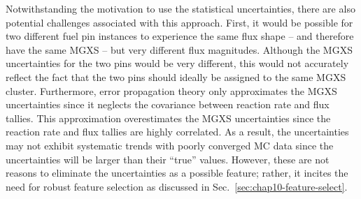 Notwithstanding the motivation to use the statistical uncertainties, there are also potential challenges associated with this approach. First, it would be possible for two different fuel pin instances to experience the same flux shape -- and therefore have the same \ac{MGXS} -- but very different flux magnitudes. Although the \ac{MGXS} uncertainties for the two pins would be very different, this would not accurately reflect the fact that the two pins should ideally be assigned to the same \ac{MGXS} cluster. Furthermore, error propagation theory only approximates the \ac{MGXS} uncertainties since it neglects the covariance between reaction rate and flux tallies. This approximation overestimates the \ac{MGXS} uncertainties since the reaction rate and flux tallies are highly correlated. As a result, the uncertainties may not exhibit systematic trends with poorly converged \ac{MC} data since the uncertainties will be larger than their ``true'' values. However, these are not reasons to eliminate the uncertainties as a possible feature; rather, it incites the need for robust feature selection as discussed in Sec.~\ref{sec:chap10-feature-select}.



